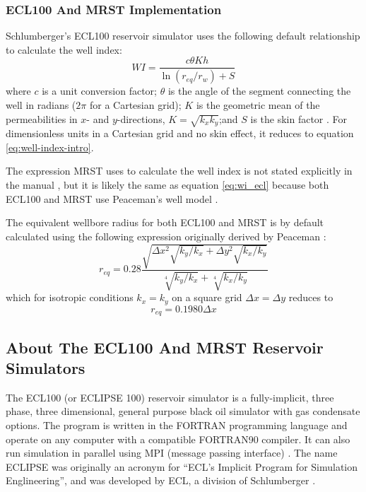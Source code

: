 \subsubsection{ECL100 And MRST Implementation} %
\label{ssub:ecl100_implementation}
Schlumberger's ECL100 reservoir simulator uses the following default relationship to calculate the well index:
\begin{equation}
    \label{eq:wi_ecl}
    WI = \frac{c\theta K h}{\ln \left(r_{eq}/r_w\right)+S}
\end{equation}
where $c$ is a unit conversion factor; $\theta$ is the angle of the segment connecting the well in radians ($2\pi$ for a Cartesian grid); $K$ is the geometric mean of the permeabilities in $x$- and $y$-directions, $K=\sqrt{k_x k_y}$;and $S$ is the skin factor \cite{Schlumberger2013Eclipse}. For dimensionless units in a Cartesian grid and no skin effect, it reduces to equation \eqref{eq:well-index-intro}.

The expression MRST uses to calculate the well index is not stated explicitly in the manual \cite{Lie2014Introduction}, but it is likely the same as equation \eqref{eq:wi_ecl} because both ECL100 and MRST use Peaceman's well model \cite{Lie2014Introduction,Schlumberger2013Eclipse}.

The equivalent wellbore radius for both ECL100 and MRST is by default calculated using the following expression \cite{Schlumberger2013Eclipse,Lie2014Introduction} originally derived by Peaceman \cite{Peaceman1983Interpretation}:
\begin{equation}
    r_{eq} = 0.28 \frac{\sqrt{\Delta x^2 \sqrt{k_y/k_x} + \Delta y^2 \sqrt{k_x/k_y}}}{\sqrt[4]{k_y/k_x}+\sqrt[4]{k_x/k_y}}
\end{equation}
which for isotropic conditions $k_x=k_y$ on a square grid $\Delta x= \Delta y$ reduces to
\begin{equation}
    r_{eq} = 0.1980 \Delta x
\end{equation}

\subsection{About The ECL100 And MRST Reservoir Simulators} %
\label{sub:about_the_ecl100_and_mrst_reservoir_simulators}
The ECL100 (or ECLIPSE 100) reservoir simulator is a fully-implicit, three phase, three dimensional, general purpose black oil simulator with gas condensate options. The program is written in the FORTRAN programming language and operate on any computer with a compatible FORTRAN90 compiler. It can also run simulation in parallel using MPI (message passing interface) \cite{Schlumberger2013Eclipse}. The name ECLIPSE was originally an acronym for ``ECL's Implicit Program for Simulation Englineering'', and was developed by ECL, a division of Schlumberger \cite{Wikipedia2014Eclipse}.

